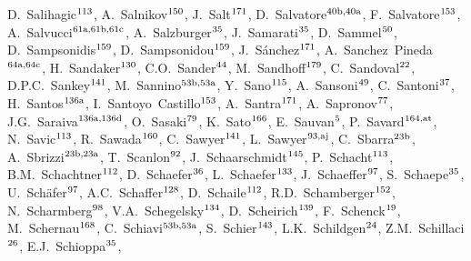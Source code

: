 \begin{flushleft}
D.~Salihagic$^\textrm{\scriptsize 113}$,    
A.~Salnikov$^\textrm{\scriptsize 150}$,    
J.~Salt$^\textrm{\scriptsize 171}$,    
D.~Salvatore$^\textrm{\scriptsize 40b,40a}$,    
F.~Salvatore$^\textrm{\scriptsize 153}$,    
A.~Salvucci$^\textrm{\scriptsize 61a,61b,61c}$,    
A.~Salzburger$^\textrm{\scriptsize 35}$,    
J.~Samarati$^\textrm{\scriptsize 35}$,    
D.~Sammel$^\textrm{\scriptsize 50}$,    
D.~Sampsonidis$^\textrm{\scriptsize 159}$,    
D.~Sampsonidou$^\textrm{\scriptsize 159}$,    
J.~S\'anchez$^\textrm{\scriptsize 171}$,    
A.~Sanchez~Pineda$^\textrm{\scriptsize 64a,64c}$,    
H.~Sandaker$^\textrm{\scriptsize 130}$,    
C.O.~Sander$^\textrm{\scriptsize 44}$,    
M.~Sandhoff$^\textrm{\scriptsize 179}$,    
C.~Sandoval$^\textrm{\scriptsize 22}$,    
D.P.C.~Sankey$^\textrm{\scriptsize 141}$,    
M.~Sannino$^\textrm{\scriptsize 53b,53a}$,    
Y.~Sano$^\textrm{\scriptsize 115}$,    
A.~Sansoni$^\textrm{\scriptsize 49}$,    
C.~Santoni$^\textrm{\scriptsize 37}$,    
H.~Santos$^\textrm{\scriptsize 136a}$,    
I.~Santoyo~Castillo$^\textrm{\scriptsize 153}$,    
A.~Santra$^\textrm{\scriptsize 171}$,    
A.~Sapronov$^\textrm{\scriptsize 77}$,    
J.G.~Saraiva$^\textrm{\scriptsize 136a,136d}$,    
O.~Sasaki$^\textrm{\scriptsize 79}$,    
K.~Sato$^\textrm{\scriptsize 166}$,    
E.~Sauvan$^\textrm{\scriptsize 5}$,    
P.~Savard$^\textrm{\scriptsize 164,at}$,    
N.~Savic$^\textrm{\scriptsize 113}$,    
R.~Sawada$^\textrm{\scriptsize 160}$,    
C.~Sawyer$^\textrm{\scriptsize 141}$,    
L.~Sawyer$^\textrm{\scriptsize 93,aj}$,    
C.~Sbarra$^\textrm{\scriptsize 23b}$,    
A.~Sbrizzi$^\textrm{\scriptsize 23b,23a}$,    
T.~Scanlon$^\textrm{\scriptsize 92}$,    
J.~Schaarschmidt$^\textrm{\scriptsize 145}$,    
P.~Schacht$^\textrm{\scriptsize 113}$,    
B.M.~Schachtner$^\textrm{\scriptsize 112}$,    
D.~Schaefer$^\textrm{\scriptsize 36}$,    
L.~Schaefer$^\textrm{\scriptsize 133}$,    
J.~Schaeffer$^\textrm{\scriptsize 97}$,    
S.~Schaepe$^\textrm{\scriptsize 35}$,    
U.~Sch\"afer$^\textrm{\scriptsize 97}$,    
A.C.~Schaffer$^\textrm{\scriptsize 128}$,    
D.~Schaile$^\textrm{\scriptsize 112}$,    
R.D.~Schamberger$^\textrm{\scriptsize 152}$,    
N.~Scharmberg$^\textrm{\scriptsize 98}$,    
V.A.~Schegelsky$^\textrm{\scriptsize 134}$,    
D.~Scheirich$^\textrm{\scriptsize 139}$,    
F.~Schenck$^\textrm{\scriptsize 19}$,    
M.~Schernau$^\textrm{\scriptsize 168}$,    
C.~Schiavi$^\textrm{\scriptsize 53b,53a}$,    
S.~Schier$^\textrm{\scriptsize 143}$,    
L.K.~Schildgen$^\textrm{\scriptsize 24}$,    
Z.M.~Schillaci$^\textrm{\scriptsize 26}$,    
E.J.~Schioppa$^\textrm{\scriptsize 35}$,    

\end{flushleft}
